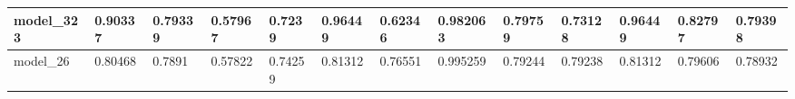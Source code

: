 \begin{tabular}{|l|l|l|l|l|l|l|l|l|l|l|l|l|}
model\_323     & 0.90337     & 0.79339        & 0.57967      & 0.7239           & 0.96449              & 0.62346              & 0.982063     & 0.79759           & 0.73128            & 0.96449         & 0.82797     & 0.79398      \\ \hline
model\_26      & 0.80468     & 0.7891         & 0.57822      & 0.74259          & 0.81312              & 0.76551              & 0.995259     & 0.79244           & 0.79238            & 0.81312         & 0.79606     & 0.78932      \\ \hline
\end{tabular}